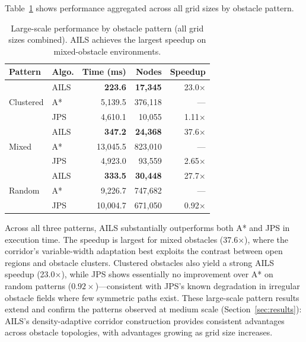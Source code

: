 \documentclass[journal]{IEEEtran}
\begin{document}
Table~\ref{tab:large_scale_pattern} shows performance aggregated across all grid sizes by obstacle pattern.

\begin{table}[h]
\centering
\caption{Large-scale performance by obstacle pattern (all grid sizes combined). AILS achieves the largest speedup on mixed-obstacle environments.}
\label{tab:large_scale_pattern}
\footnotesize
\begin{tabular}{llrrr}
\toprule
Pattern & Algo. & Time (ms) & Nodes & Speedup \\
\midrule
\multirow{3}{*}{Clustered}
 & AILS & \textbf{223.6} & \textbf{17,345} & 23.0$\times$ \\
 & A*   & 5,139.5 & 376,118 & --- \\
 & JPS  & 4,610.1 & 10,055  & 1.11$\times$ \\
\midrule
\multirow{3}{*}{Mixed}
 & AILS & \textbf{347.2} & \textbf{24,368} & 37.6$\times$ \\
 & A*   & 13,045.5 & 823,010 & --- \\
 & JPS  & 4,923.0  & 93,559  & 2.65$\times$ \\
\midrule
\multirow{3}{*}{Random}
 & AILS & \textbf{333.5} & \textbf{30,448} & 27.7$\times$ \\
 & A*   & 9,226.7  & 747,682 & --- \\
 & JPS  & 10,004.7 & 671,050 & 0.92$\times$ \\
\bottomrule
\end{tabular}
\normalsize
\end{table}

Across all three patterns, AILS substantially outperforms both A* and JPS in execution time.
The speedup is largest for mixed obstacles (37.6$\times$), where the corridor's variable-width adaptation best exploits the contrast between open regions and obstacle clusters.
Clustered obstacles also yield a strong AILS speedup (23.0$\times$), while JPS shows essentially no improvement over A* on random patterns ($0.92{\times}$)---consistent with JPS's known degradation in irregular obstacle fields where few symmetric paths exist.
These large-scale pattern results extend and confirm the patterns observed at medium scale (Section~\ref{sec:results}): AILS's density-adaptive corridor construction provides consistent advantages across obstacle topologies, with advantages growing as grid size increases.

\end{document}
